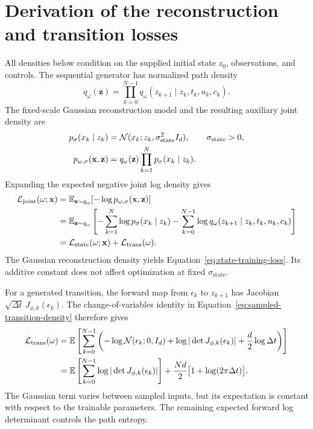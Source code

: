 \section{Derivation of the reconstruction and transition losses}\label{app:training-loss}

All densities below condition on the supplied initial state $z_0$, observations, and controls. The sequential generator has normalized path density
\begin{equation}\label{eq:training-path-density}
 q_\omega(\mathbf z)
 =\prod_{k=0}^{N-1}q_\omega(z_{k+1}\mid z_k,t_k,u_k,c_k).
\end{equation}
The fixed-scale Gaussian reconstruction model and the resulting auxiliary joint density are
\begin{align}
 p_\sigma(x_k\mid z_k)&=\mathcal N(x_k;z_k,\sigma_{\mathrm{state}}^2I_d),
 \qquad \sigma_{\mathrm{state}}>0,\label{eq:reconstruction-model}\\
 p_{\omega,\sigma}(\mathbf x,\mathbf z)
 &=q_\omega(\mathbf z)\prod_{k=1}^N p_\sigma(x_k\mid z_k).\label{eq:training-joint-density}
\end{align}
Expanding the expected negative joint log density gives
\begin{align}\label{eq:joint-training-loss}
 \mathcal L_{\mathrm{joint}}(\omega;\mathbf x)
 &=\mathbb E_{\mathbf z\sim q_\omega}[-\log p_{\omega,\sigma}(\mathbf x,\mathbf z)]\notag\\
 &=\mathbb E_{\mathbf z\sim q_\omega}
 \left[-\sum_{k=1}^N\log p_\sigma(x_k\mid z_k)
       -\sum_{k=0}^{N-1}\log q_\omega(z_{k+1}\mid z_k,t_k,u_k,c_k)\right]\notag\\
 &=\mathcal L_{\mathrm{state}}(\omega;\mathbf x)+\mathcal L_{\mathrm{trans}}(\omega).
\end{align}
The Gaussian reconstruction density yields Equation~\eqref{eq:state-training-loss}. Its additive constant does not affect optimization at fixed $\sigma_{\mathrm{state}}$.

For a generated transition, the forward map from $\epsilon_k$ to $z_{k+1}$ has Jacobian $\sqrt{\Delta t}\,J_{\phi,k}(\epsilon_k)$. The change-of-variables identity in Equation~\eqref{eq:sampled-transition-density} therefore gives
\begin{align}\label{eq:self-transition-loss}
 \mathcal L_{\mathrm{trans}}(\omega)
 &=\mathbb E\left[\sum_{k=0}^{N-1}
 \left(-\log\mathcal N(\epsilon_k;0,I_d)+\log|\det J_{\phi,k}(\epsilon_k)|
       +\frac d2\log\Delta t\right)\right]\notag\\
 &=\mathbb E\left[\sum_{k=0}^{N-1}\log|\det J_{\phi,k}(\epsilon_k)|\right]
   +\frac{Nd}{2}\bigl[1+\log(2\pi\Delta t)\bigr].
\end{align}
The Gaussian term varies between sampled inputs, but its expectation is constant with respect to the trainable parameters. The remaining expected forward log determinant controls the path entropy.

